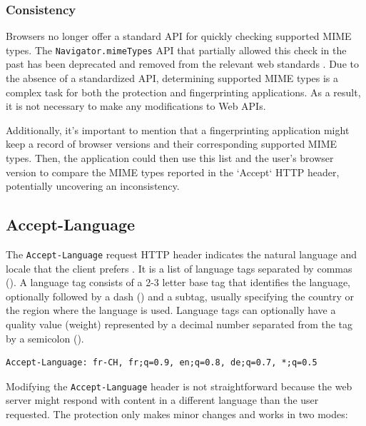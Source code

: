 \subsubsection{Consistency}

Browsers no longer offer a standard API for quickly checking supported MIME types. The \texttt{Navigator.mimeTypes} API that partially allowed this check in the past has been deprecated and removed from the relevant web standards \cite{MDNNavigatorInterface}. Due to the absence of a standardized API, determining supported MIME types is a complex task for both the protection and fingerprinting applications. As a result, it is not necessary to make any modifications to Web APIs.

Additionally, it's important to mention that a fingerprinting application might keep a record of browser versions and their corresponding supported MIME types. Then, the application could then use this list and the user's browser version to compare the MIME types reported in the `Accept` HTTP header, potentially uncovering an inconsistency.

\subsection{Accept-Language}
\label{SubSection:AcceptLanguage}

The \texttt{Accept-Language} request HTTP header indicates the natural language and locale that the client prefers \cite{MDN}. It is a list of language tags separated by commas (\uv{,}). A language tag consists of a 2-3 letter base tag that identifies the language, optionally followed by a dash (\uv{-}) and a subtag, usually specifying the country or the region where the language is used. Language tags can optionally have a quality value (weight) represented by a decimal number separated from the tag by a semicolon (\uv{;}).

\bigbreak

\begin{lstlisting}[caption={An example of Accept-Language header contents \cite{MDN}.}, label={AcceptLanguageExample}]
Accept-Language: fr-CH, fr;q=0.9, en;q=0.8, de;q=0.7, *;q=0.5
\end{lstlisting}

\medbreak

Modifying the \texttt{Accept-Language} header is not straightforward because the web server might respond with content in a different language than the user requested. The protection only makes minor changes and works in two modes:

